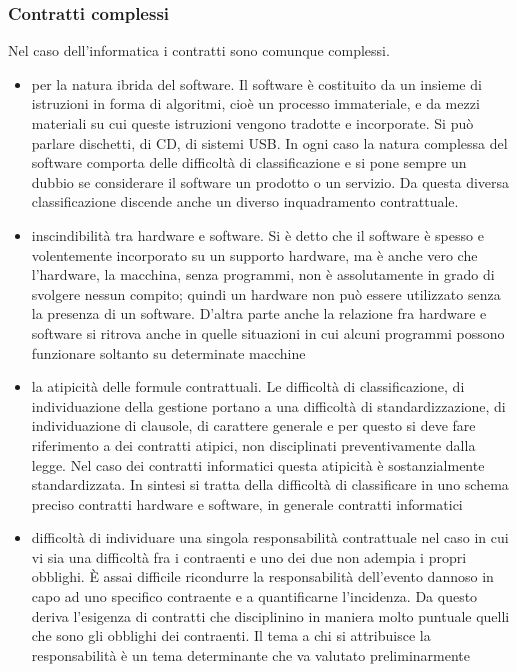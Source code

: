 \subsubsection{Contratti complessi}
 Nel caso dell'informatica i contratti sono comunque complessi.
 
\begin{itemize}
    \item per la natura ibrida del software. Il software è costituito da un insieme di istruzioni in forma di algoritmi, cioè un processo immateriale, e da mezzi materiali su cui queste istruzioni vengono tradotte e incorporate. Si può parlare dischetti, di CD, di sistemi USB. In ogni caso la natura complessa del software comporta delle difficoltà di classificazione e si pone sempre un dubbio se considerare il software un prodotto o un servizio. Da questa diversa classificazione discende anche un diverso inquadramento contrattuale.
    \item  inscindibilità tra hardware e software. Si è detto che il software è spesso e volentemente incorporato su un supporto hardware, ma è anche vero che l'hardware, la macchina, senza programmi, non è assolutamente in grado di svolgere nessun compito; quindi un hardware non può essere utilizzato senza la presenza di un software. D'altra parte anche la relazione fra hardware e software si ritrova anche in quelle situazioni in cui alcuni programmi possono funzionare soltanto su determinate macchine
    \item la atipicità delle formule contrattuali. Le difficoltà di classificazione, di individuazione della gestione portano a una difficoltà di standardizzazione, di individuazione di clausole, di carattere generale e per questo si deve fare riferimento a dei contratti atipici, non disciplinati preventivamente dalla legge. Nel caso dei contratti informatici questa atipicità è sostanzialmente standardizzata. In sintesi si tratta della difficoltà di classificare in uno schema preciso contratti hardware e software, in generale contratti informatici
    \item  difficoltà di individuare una singola responsabilità contrattuale nel caso in cui vi sia una difficoltà fra i contraenti e uno dei due non adempia i propri obblighi. È assai difficile ricondurre la responsabilità dell'evento dannoso in capo ad uno specifico contraente e a quantificarne l'incidenza. Da questo deriva l'esigenza di contratti che disciplinino in maniera molto puntuale quelli che sono gli obblighi dei contraenti. Il tema a chi si attribuisce la responsabilità è un tema determinante che va valutato preliminarmente


\end{itemize}
 
